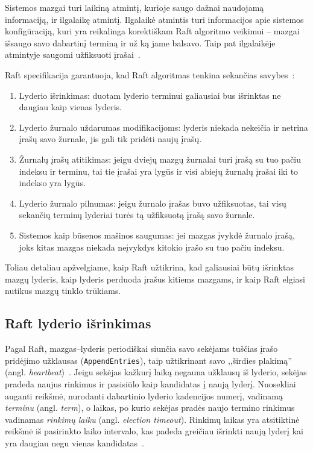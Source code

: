 \documentclass{VUMIFPSkursinis}
\begin{document}
Sistemos mazgai turi laikiną atmintį, kurioje saugo dažnai naudojamą informaciją, ir ilgalaikę atmintį. Ilgalaikė atmintis turi informacijos apie sistemos konfigūraciją, kuri yra reikalinga korektiškam Raft algoritmo veikimui -- mazgai išsaugo savo dabartinį terminą ir už ką jame balsavo. Taip pat ilgalaikėje atmintyje saugomi užfiksuoti įrašai~\cite{ongaro_consensus}.

Raft specifikacija garantuoja, kad Raft algoritmas tenkina sekančias savybes~\cite{ongaro_consensus}: 

\begin{enumerate}
\item Lyderio išrinkimas: duotam lyderio terminui galiausiai bus išrinktas ne daugiau kaip vienas lyderis.
\item Lyderio žurnalo uždarumas modifikacijoms: lyderis niekada nekeičia ir netrina įrašų savo žurnale, jis gali tik pridėti naujų įrašų.
\item Žurnalų įrašų atitikimas: jeigu dviejų mazgų žurnalai turi įrašą su tuo pačiu indeksu ir terminu, tai tie įrašai yra lygūs ir visi abiejų žurnalų įrašai iki to indekso yra lygūs.
\item Lyderio žurnalo pilnumas: jeigu žurnalo įrašas buvo užfiksuotas, tai visų sekančių terminų lyderiai turės tą užfiksuotą įrašą savo žurnale.
\item Sistemos kaip būsenos mašinos saugumas: jei mazgas įvykdė žurnalo įrašą, joks kitas mazgas niekada neįvykdys kitokio įrašo su tuo pačiu indeksu.
\end{enumerate}

Toliau detaliau apžvelgiame, kaip Raft užtikrina, kad galiausiai būtų išrinktas mazgų lyderis, kaip lyderis perduoda įrašus kitiems mazgams, ir kaip Raft elgiasi nutikus mazgų tinklo trūkiams.

\subsection{Raft lyderio išrinkimas}

Pagal Raft, mazgas--lyderis periodiškai siunčia savo sekėjams tuščias įrašo pridėjimo užklausas (\texttt{AppendEntries}), taip užtikrinant savo ,,širdies plakimą'' (angl. \textit{heartbeat})~\cite{ongaro_consensus}. Jeigu sekėjas kažkurį laiką negauna užklausų iš lyderio, sekėjas pradeda naujus rinkimus ir pasisiūlo kaip kandidatas į naują lyderį. Nuosekliai auganti reikšmė, nurodanti dabartinio lyderio kadencijos numerį, vadinamą \textit{terminu} (angl. \emph{term}), o laikas, po kurio sekėjas pradės naujo termino rinkimus vadinamas \textit{rinkimų laiku} (angl. \textit{election timeout}). Rinkimų laikas yra atsitiktinė reikšmė iš pasirinkto laiko intervalo, kas padeda greičiau išrinkti naują lyderį kai yra daugiau negu vienas kandidatas~\cite{ongaro_consensus}.
\end{document}
